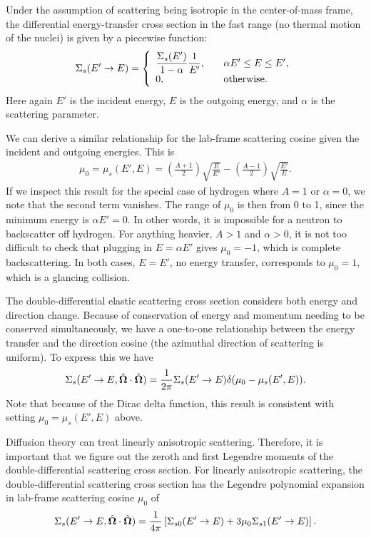 Under the assumption of scattering being isotropic in the center-of-mass frame, the differential energy-transfer cross section in the fast range (no thermal motion of the nuclei) is given by a piecewise function:
\begin{align}
  \Sigma_s(E' \rightarrow E) = \left\{ \begin{array}{l l}
  \dfrac{\Sigma_s(E')}{1-\alpha} \dfrac{1}{E'} , 	& \quad \alpha E' \le E \le E', \\
  0,												& \quad \text{otherwise}. \\ \end{array} \right.
\end{align}
Here again $E'$ is the incident energy, $E$ is the outgoing energy, and $\alpha$ is the scattering parameter.

We can derive a similar relationship for the lab-frame scattering cosine given the incident and outgoing energies. This is
\begin{align}
  \mu_0 = \mu_s( E', E ) = \left( \frac{A+1}{2} \right) \sqrt{ \frac{E}{E'} } - \left( \frac{A-1}{2} \right) \sqrt{ \frac{E'}{E} } .
\end{align}
If we inspect this result for the special case of hydrogen where $A = 1$ or $\alpha = 0$, we note that the second term vanishes. The range of $\mu_0$ is then from 0 to 1, since the minimum energy is $\alpha E' = 0$. In other words, it is impossible for a neutron to backscatter off hydrogen. For anything heavier, $A > 1$ and $\alpha > 0$, it is not too difficult to check that plugging in $E = \alpha E'$ gives $\mu_0 = -1$, which is complete backscattering. In both cases, $E = E'$, no energy transfer, corresponds to $\mu_0 = 1$, which is a glancing collision.

The double-differential elastic scattering cross section considers both energy and direction change. Because of conservation of energy and momentum needing to be conserved simultaneously, we have a one-to-one relationship between the energy transfer and the direction cosine (the azimuthal direction of scattering is uniform). To express this we have
\begin{align}
  \Sigma_s( E' \rightarrow E, \hat{\mathbf{\Omega}} \cdot \hat{\mathbf{\Omega}} ) = \frac{1}{2\pi} \Sigma_s(E' \rightarrow E ) \delta( \mu_0 - \mu_s(E',E) ) .
\end{align}
Note that because of the Dirac delta function, this result is consistent with setting $\mu_0 = \mu_s(E',E)$ above.

Diffusion theory can treat linearly anisotropic scattering. Therefore, it is important that we figure out the zeroth and first Legendre moments of the double-differential scattering cross section. For linearly anisotropic scattering, the double-differential scattering cross section has the Legendre polynomial expansion in lab-frame scattering cosine $\mu_0$ of
\begin{align}
  \Sigma_s( E' \rightarrow E, \hat{\mathbf{\Omega}} \cdot \hat{\mathbf{\Omega}} ) = \frac{1}{4\pi} \left[ \Sigma_{s0}(E' \rightarrow E ) + 3 \mu_0 \Sigma_{s1}(E' \rightarrow E) \right] .
\end{align}

